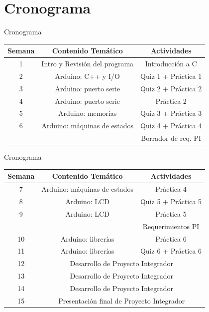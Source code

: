 \documentclass[handout,xcolor=dvipsnames]{beamer}
\newcommand{\pageframe}[1]{\frame{\begin{center}{ \Huge #1 }\end{center}}}
\begin{document}
\section{Cronograma}

\pageframe{Cronograma}

\begin{frame}{Cronograma}
 \begin{center}
 {\small
  \begin{tabular}{|c|c|c|}\hline

   Semana 	& \multicolumn{1}{c|}{Contenido Temático} & \multicolumn{1}{c|}{Actividades} \\ \hline \hline
   1 		& Intro y Revisión del programa & Introducción a C\\ \hline
   2 		& Arduino: C++ y I/O   		& Quiz 1 + Práctica 1 \\ \hline
   3 		& Arduino: puerto serie		& Quiz 2 + Práctica 2 \\ \hline
   4 		& Arduino: puerto serie		& Práctica 2  \\ \hline
   5		& Arduino: memorias   		& Quiz 3 + Práctica 3  \\ \hline
   6 		& Arduino: máquinas de estados	& Quiz 4 + Práctica 4  \\
    		& 							& Borrador de req. PI  \\ \hline


  \end{tabular}}
 \end{center}
\end{frame}

\begin{frame}{Cronograma}
 \begin{center}
 {\small
  \begin{tabular}{|c|c|c|}\hline
   Semana 	& \multicolumn{1}{c|}{Contenido Temático} & \multicolumn{1}{c|}{Actividades} \\ \hline \hline
   7 		& Arduino: máquinas de estados	 & Práctica 4 \\ \hline
   8 		& Arduino: LCD					 & Quiz 5 + Práctica 5 \\ \hline

   9 		& Arduino: LCD      		     & Práctica 5 \\ 
    		& 							& Requerimientos PI  \\ \hline
   10 		& Arduino: librerías			& Práctica 6  \\ \hline
   11		& Arduino: librerías	& Quiz 6 + Práctica 6  \\ \hline
   12 		& \multicolumn{2}{c|}{Desarrollo de Proyecto Integrador}  \\ \hline
   13 		& \multicolumn{2}{c|}{Desarrollo de Proyecto Integrador}  \\ \hline
   14		& \multicolumn{2}{c|}{Desarrollo de Proyecto Integrador}  \\ \hline
   15 		& \multicolumn{2}{c|}{Presentación final de Proyecto Integrador}  \\ \hline
  \end{tabular}}
 \end{center}
\end{frame}
\end{document}
